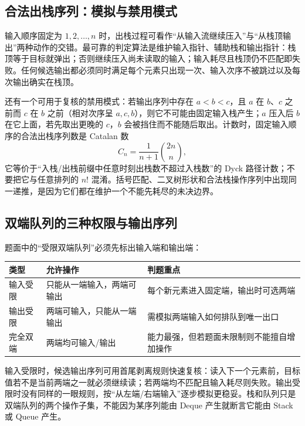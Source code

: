 \documentclass[UTF8,fontset=none,11pt,a4paper]{ctexart}
\begin{document}
\subsection{合法出栈序列：模拟与禁用模式}
输入顺序固定为 $1,2,\ldots,n$ 时，出栈过程可看作“从输入流继续压入”与“从栈顶输出”两种动作的交错。最可靠的判定算法是维护输入指针、辅助栈和输出指针：栈顶等于目标就弹出；否则继续压入尚未读取的输入；输入耗尽且栈顶仍不匹配即失败。任何候选输出都必须同时满足每个元素只出现一次、输入次序不被跳过以及每次输出确实在栈顶。

还有一个可用于复核的禁用模式：若输出序列中存在 $a<b<c$，且 $a$ 在 $b$、$c$ 之前而 $c$ 在 $b$ 之前（相对次序呈 $a,c,b$），则它不可能由固定输入栈产生；$a$ 压入后 $b$ 在它上面，若先取出更晚的 $c$，$b$ 会被挡住而不能随后取出。计数时，固定输入顺序的合法出栈序列数是 Catalan 数
\[
C_n=\frac{1}{n+1}\binom{2n}{n},
\]
它等价于“入栈/出栈前缀中任意时刻出栈数不超过入栈数”的 Dyck 路径计数；不要把它与任意排列的 $n!$ 混淆。括号匹配、二叉树形状和合法栈操作序列中出现同一递推，是因为它们都在维护一个不能先耗尽的未决边界。

\subsection{双端队列的三种权限与输出序列}
题面中的“受限双端队列”必须先标出输入端和输出端：
\begin{center}\small
\begin{tabularx}{\linewidth}{L{2.1cm}YY}
\toprule
类型 & 允许操作 & 判题重点\\\midrule
输入受限 & 只能从一端输入，两端可输出 & 每个新元素进入固定端，输出时可选两端\\
输出受限 & 两端可输入，只能从一端输出 & 需模拟两端输入如何排队到唯一出口\\
完全双端 & 两端均可输入/输出 & 能力最强，但若题面未限制则不能擅自增加操作\\
\bottomrule
\end{tabularx}\end{center}
输入受限时，候选输出序列可用首尾剥离规则快速复核：读入下一个元素前，目标值若不是当前两端之一就必须继续读；若两端均不匹配且输入耗尽则失败。输出受限时没有同样的一眼规则，按“从左端/右端输入”逐步模拟更稳妥。栈和队列只是双端队列的两个操作子集，不能因为某序列能由 Deque 产生就断言它能由 Stack 或 Queue 产生。
\end{document}
